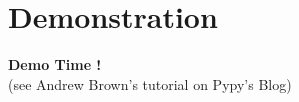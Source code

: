 \documentclass{beamer}
\begin{document}
\section{Demonstration}
\frame
{
\begin{center}
\textbf{Demo Time !}\\
(see Andrew Brown's tutorial on Pypy's Blog)
\end{center}
}


\end{document}
